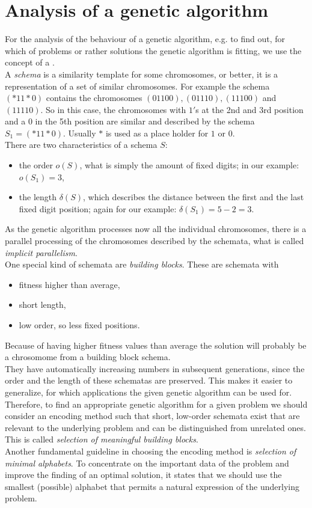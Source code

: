\section{Analysis of a genetic algorithm}
For the analysis of the behaviour of a genetic algorithm, e.g. to find out, for which  of problems or rather solutions the genetic algorithm is fitting, we use the concept of a .\\
A \emph{schema} is a similarity template for some chromosomes, or better, it is a representation of a set of similar chromosomes. For example the schema $(*11{*}0)$ contains the chromosomes $(01100), (01110), (11100)$ and $(11110)$. So in this case, the chromosomes with $1'$s at the 2nd and 3rd position and a $0$ in the 5th position are similar and described by the schema $S_1=(*11{*}0)$. Usually $*$ is used as a place holder for $1$ or $0$.\\
There are two characteristics of a schema $S$:
\begin{itemize}
\item the order $o(S)$, what is simply the amount of fixed digits; in our example: \mbox{$o(S_1)=3$},
\item the length $\delta(S)$, which describes the distance between the first and the last fixed digit position; again for our example: $\delta(S_1)=5-2=3$.
\end{itemize}
As the genetic algorithm processes now all the individual chromosomes, there is a parallel processing of the chromosomes described by the schemata, what is called \emph{implicit parallelism}.\\
One special kind of schemata are \emph{building blocks}. These are schemata with
\begin{itemize}
\item fitness higher than average,
\item short length,
\item low order, so less fixed positions.
\end{itemize}
Because of having higher fitness values than average the solution will probably be a chrosomome from a building block schema.\\
They have automatically increasing numbers in subsequent generations, since the order and the length of these schematas are preserved. This makes it easier to generalize, for which applications the given genetic algorithm can be used for.\\
Therefore, to find an appropriate genetic algorithm for a given problem we should consider an encoding method such that short, low-order schemata exist that are relevant to the underlying problem and can be distinguished from unrelated ones. This is called \emph{selection of meaningful building blocks}.\\
Another fundamental guideline in choosing the encoding method is \emph{selection of minimal alphabets}. To concentrate on the important data of the problem and improve the finding of an optimal solution, it states that we should use the smallest (possible) alphabet that permits a natural expression of the underlying problem.



